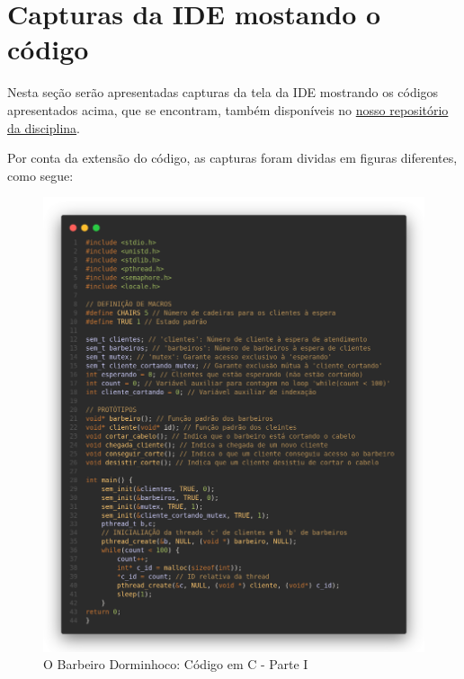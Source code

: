 \documentclass[
	12pt,				%
	openright,			%
	oneside,			%
	a4paper,			%
	chapter=TITLE,		%
	english,			%
	french,				%
	spanish,			%
	brazil				%
	]{abntex2}
\theoremstyle{definition}
\begin{document}
\section{Capturas da IDE mostando o código}
Nesta seção serão apresentadas capturas da tela da IDE mostrando os códigos apresentados acima, que se encontram, também disponíveis no
\href{https://github.com/jvictorferreira3301/Sistemas_Operacionais}{nosso repositório da disciplina}.

Por conta da extensão do código, as capturas foram dividas em figuras diferentes, como segue:

\begin{figure}[h]
    \centering
    \includegraphics[width=1.0\textwidth]{imagens/barbeiro_1.png}
    \caption{O Barbeiro Dorminhoco: Código em C - Parte I}
    \label{fig:barbeiro_1}
\end{figure}
\end{document}
